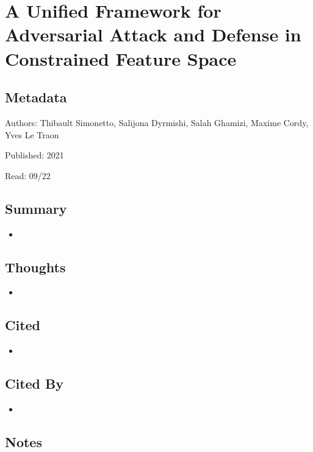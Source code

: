 \documentclass{article}
\begin{document}

\section*{A Unified Framework for Adversarial Attack and Defense in Constrained Feature Space}

\subsection*{Metadata}

\noindent Authors: Thibault Simonetto, Salijona Dyrmishi, Salah Ghamizi, Maxime Cordy, Yves Le Traon

\noindent Published: 2021

\noindent Read: 09/22

\subsection*{Summary}
\begin{itemize}
	\item
\end{itemize}

\subsection*{Thoughts}
\begin{itemize}
	\item
\end{itemize}

\subsection*{Cited}
\begin{itemize}
	\item
\end{itemize}

\subsection*{Cited By}
\begin{itemize}
	\item
\end{itemize}

\subsection*{Notes}
\end{document}
